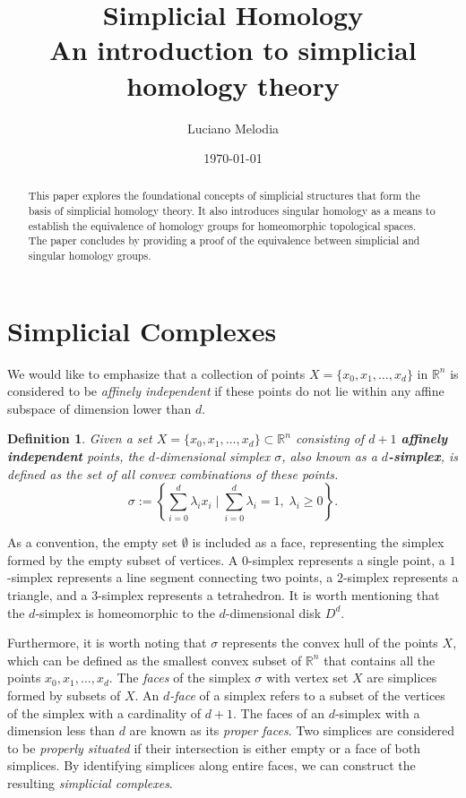 \documentclass{article}
\title{\textbf{Simplicial Homology} \\[0.2cm] \large An introduction to simplicial homology theory}
\author{Luciano Melodia}
\date{\today}
\newtheorem{definition}{Definition}[section]
\begin{document}
\maketitle
\begin{abstract}
This paper explores the foundational concepts of simplicial structures that form the basis of simplicial homology theory. It also introduces singular homology as a means to establish the equivalence of homology groups for homeomorphic topological spaces. The paper concludes by providing a proof of the equivalence between simplicial and singular homology groups.
\end{abstract}
\tableofcontents

\section{Simplicial Complexes}
We would like to emphasize that a collection of points $X = \{x_0, x_1, \ldots, x_d\}$ in $\mathbb{R}^n$ is considered to be \emph{affinely independent} if these points do not lie within any affine subspace of dimension lower than $d$.

\begin{definition}
Given a set $X = \{x_0, x_1, \ldots, x_d\} \subset \mathbb{R}^n$ consisting of $d+1$ \textbf{affinely independent} points, the $d$-dimensional simplex $\sigma$, also known as a \textbf{\emph{$d$-simplex}}, is defined as the set of all convex combinations of these points.
\begin{equation}
	\sigma := \left\{\sum_{i=0}^{d} \lambda_i x_i \; \vert \; \sum_{i=0}^{d} \lambda_i = 1, \; \lambda_i \geq 0 \right\}.
\end{equation}
\end{definition}

As a convention, the empty set $\emptyset$ is included as a face, representing the simplex formed by the empty subset of vertices. A $0$-simplex represents a single point, a $1$-simplex represents a line segment connecting two points, a $2$-simplex represents a triangle, and a $3$-simplex represents a tetrahedron. It is worth mentioning that the $d$-simplex is homeomorphic to the $d$-dimensional disk $D^d$.

Furthermore, it is worth noting that $\sigma$ represents the convex hull of the points $X$, which can be defined as the smallest convex subset of $\mathbb{R}^n$ that contains all the points $x_0, x_1, \ldots, x_d$. The \emph{faces} of the simplex $\sigma$ with vertex set $X$ are simplices formed by subsets of $X$. An \emph{$d$-face} of a simplex refers to a subset of the vertices of the simplex with a cardinality of $d+1$. The faces of an $d$-simplex with a dimension less than $d$ are known as its \emph{proper faces}. Two simplices are considered to be \emph{properly situated} if their intersection is either empty or a face of both simplices. By identifying simplices along entire faces, we can construct the resulting \emph{simplicial complexes}.
\end{document}

